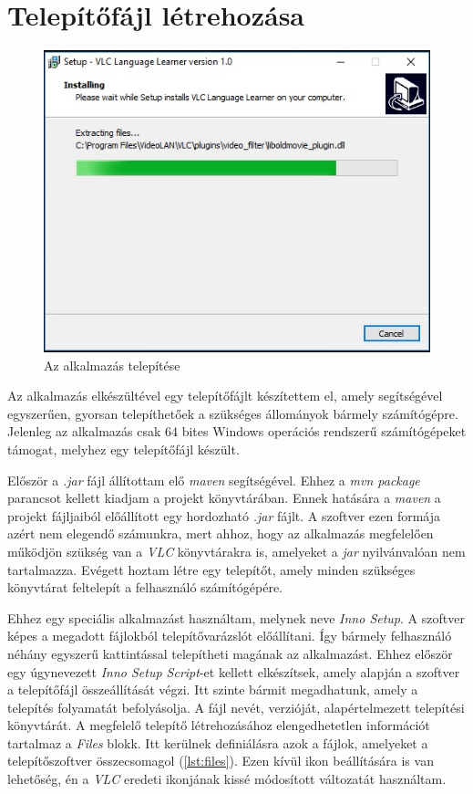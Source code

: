 \section{Telepítőfájl létrehozása}

\begin{figure}[h!]
\centering
  \includegraphics[width=.7\linewidth]{images/installer.jpg}
  \caption{Az alkalmazás telepítése}
  \label{fig:installer}
\end{figure}


Az alkalmazás elkészültével egy telepítőfájlt készítettem el, amely segítségével egyszerűen, gyorsan telepíthetőek a szükséges állományok bármely számítógépre. Jelenleg az alkalmazás csak 64 bites Windows operációs rendszerű számítógépeket támogat, melyhez egy telepítőfájl készült.

Először a \textit{.jar} fájl állítottam elő \textit{maven} segítségével. Ehhez a \textit{mvn package} parancsot kellett kiadjam a projekt könyvtárában. Ennek hatására a \textit{maven} a projekt fájljaiból előállított egy hordozható \textit{.jar} fájlt. A szoftver ezen formája azért nem elegendő számunkra, mert ahhoz, hogy az alkalmazás megfelelően működjön szükség van a \textit{VLC} könyvtárakra is, amelyeket a \textit{jar} nyilvánvalóan nem tartalmazza. Evégett hoztam létre egy telepítőt, amely minden szükséges könyvtárat feltelepít a felhasználó számítógépére.

Ehhez egy speciális alkalmazást használtam, melynek neve \textit{Inno Setup}. A szoftver képes a megadott fájlokból telepítővarázslót előállítani. Így bármely felhasználó néhány egyszerű kattintással telepítheti magának az alkalmazást. Ehhez először egy úgynevezett \textit{Inno Setup Script}-et kellett elkészítsek, amely alapján a szoftver a telepítőfájl összeállítását végzi. Itt szinte bármit megadhatunk, amely a telepítés folyamatát befolyásolja. A fájl nevét, verzióját, alapértelmezett telepítési könyvtárát. A megfelelő telepítő létrehozásához elengedhetetlen információt tartalmaz a \textit{Files} blokk. Itt kerülnek definiálásra azok a fájlok, amelyeket a telepítőszoftver összecsomagol (\ref{lst:files}). Ezen kívül ikon beállítására is van lehetőség, én a \textit{VLC} eredeti ikonjának kissé módosított változatát használtam.

